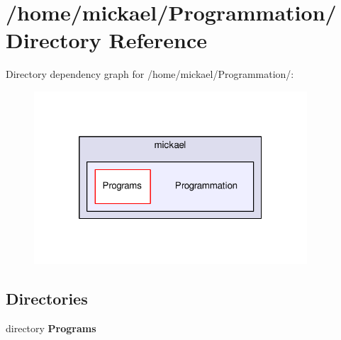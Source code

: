 \section{/home/mickael/\-Programmation/ Directory Reference}
\label{dir_7fc0b427eb323df26681d121ebe400ce}
Directory dependency graph for /home/mickael/\-Programmation/\-:\nopagebreak
\begin{figure}[H]
\begin{center}
\leavevmode
\includegraphics[width=289pt]{dir_7fc0b427eb323df26681d121ebe400ce_dep}
\end{center}
\end{figure}
\subsection*{Directories}
\begin{DoxyCompactItemize}
\item 
directory {\bf Programs}
\end{DoxyCompactItemize}
